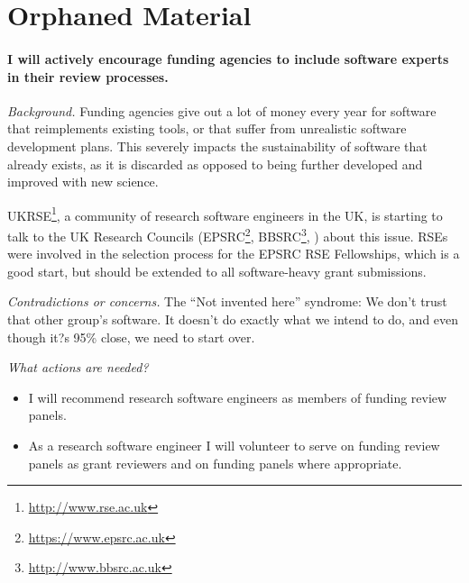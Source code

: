 
\section*{Orphaned Material}

\paragraph{I will actively encourage funding agencies to include software experts in their review processes.}


\emph{Background.}
Funding agencies give out a lot of money every year for software that reimplements existing tools, or that suffer from unrealistic software development plans. This severely impacts the sustainability of software that already exists, as it is discarded as opposed to being further developed and improved with new science.

UKRSE\footnote{\url{http://www.rse.ac.uk}}, a community of research software engineers in the UK, is starting to talk to the UK Research Councils (EPSRC\footnote{\url{https://www.epsrc.ac.uk}}, BBSRC\footnote{\url{http://www.bbsrc.ac.uk}}, \etc) about this issue. RSEs were involved in the selection process for the EPSRC RSE Fellowships, which is a good start, but should be extended to all software-heavy grant submissions.

\emph{Contradictions or concerns.}
The ``Not invented here'' syndrome: We don't trust that other group's software.
It doesn't do exactly what we intend to do, and even though it?s 95\% close, we need to start over.

\emph{What actions are needed?}
\begin{itemize}
\item I will recommend research software engineers as members of funding review panels.
\item As a research software engineer I will volunteer to serve on funding review panels as grant reviewers and on funding panels where appropriate.
\end{itemize}

